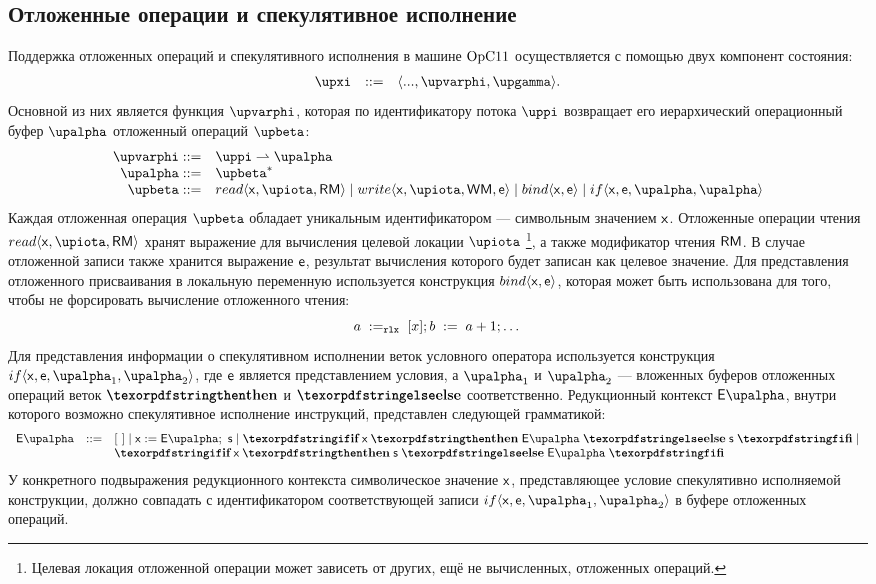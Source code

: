 \subsection{Отложенные операции и спекулятивное исполнение}
\label{sec:opc11:formal:spec}

Поддержка отложенных операций и спекулятивного исполнения в машине $\mathrm{OpC11}$ осуществляется
с помощью двух компонент состояния:
\[\begin{array}{r c l}
\auxX             & ::=        & \angled{..., \stPhi, \stGamma}. \\
\end{array}\]
Основной из них является функция $\stPhi$, которая по идентификатору потока $\stpath$ возвращает его иерархический
операционный буфер $\stAlpha$ отложенный операций $\stPostOp$:
\[\begin{array}{r l}
    \stPhi    ::= & \stpath \prarrow \stAlpha \\
    \stAlpha  ::= & \stPostOp^{*} \\
    \stPostOp ::= & read\angled{\vName,\locVar,\RM} \mid
                    write\angled{\vName,\locVar,\WM,\Expr} \mid
                    bind\angled{\vName,\Expr} \mid
                    if\angled{\vName,\Expr,\stAlpha,\stAlpha}\\
\end{array}\]
Каждая отложенная операция $\stPostOp$ обладает уникальным идентификатором --- символьным значением $\mathsf{x}$.
Отложенные операции чтения $read\angled{\vName,\locVar,\RM}$ хранят выражение для вычисления целевой локации $\locvar$%
\footnote{Целевая локация отложенной операции может зависеть от других,
ещё не вычисленных, отложенных операций.},
а также модификатор чтения $\mathsf{RM}$.
В случае отложенной записи также хранится выражение $\mathsf{e}$, результат вычисления которого будет записан как целевое значение.
Для представления отложенного присваивания в локальную переменную используется конструкция $bind\langle \mathsf{x}, \mathsf{e} \rangle$, которая
может быть использована для того, чтобы не форсировать вычисление отложенного чтения:
\[
a \;:=_{\mathtt{rlx}}\;[x]; b\;:=\;a + 1; \dots
\]
Для представления информации о спекулятивном исполнении веток условного оператора используется конструкция
$if\angled{\vName,\Expr,\stAlpha_1,\stAlpha_2}$,
где $\mathsf{e}$ является представлением условия, а $\stAlpha_1$ и $\stAlpha_2$ --- вложенных буферов отложенных операций
веток $\kw{then}$ и $\kw{else}$ соответственно.
Редукционный контекст $\EvalSpecContext$, внутри которого возможно спекулятивное исполнение инструкций, представлен
следующей грамматикой:
\[\begin{array}{rcl}
\EvalSpecContext & ::= & \hole \mid
                         \Bind{\vName}{\EvalSpecContext}{\AST} \mid
    \IfThenElse{\vName}{\EvalSpecContext}{\AST}\mid \\
&& \IfThenElse{\vName}{\AST}{\EvalSpecContext}
\end{array}\]
У конкретного подвыражения редукционного контекста символическое значение $\mathsf{x}$, представляющее условие спекулятивно
исполняемой конструкции, должно совпадать с идентификатором соответствующей записи $if\angled{\vName,\Expr,\stAlpha_1,\stAlpha_2}$
в буфере отложенных операций.

